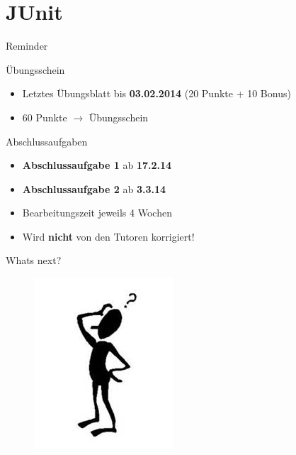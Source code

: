 \documentclass[18pt]{beamer}
\begin{document}
\section{JUnit}

\begin{frame}{Reminder}
\begin{block}{Übungsschein}
  \begin{itemize}
    \item Letztes Übungsblatt bis \textbf{03.02.2014} (20 Punkte + 10 Bonus)
    \item 60 Punkte $\rightarrow$ Übungsschein
  \end{itemize}
\end{block}
\pause
\begin{block}{Abschlussaufgaben}
  \begin{itemize}
    \item \textbf{Abschlussaufgabe 1} ab \textbf{17.2.14}
    \item \textbf{Abschlussaufgabe 2} ab \textbf{3.3.14}
    \item Bearbeitungszeit jeweils 4 Wochen
    \item Wird \textbf{nicht} von den Tutoren korrigiert!
   \end{itemize}
\end{block}
\end{frame}

\begin{frame}{Whats next?}
        \begin{figure}%
  \includegraphics[width=0.4\columnwidth]{Man-question-mark.png}%
  \end{figure}
\end{frame}

\appendix
\beginbackup


\backupend
\end{document}
